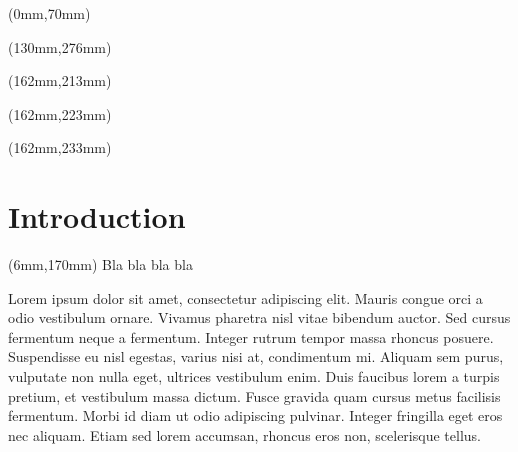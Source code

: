\documentclass[11pt,a4paper,english]{report}
\newcommand{\CorpDocTitle}{}
\newcommand{\CorpDocReviewDate}{}
\newcommand{\CorpDocAuthor}{}
\newcommand{\CorpChef}{}
\newcommand{\CorpDocType}{}
\newcommand{\CorpDocProject}{}
\def\wl{\par \vspace{\baselineskip}}
\begin{document}
\textblockorigin{0cm}{0cm} %
\begin{textblock*}{210mm}(0mm,70mm)
\centering
{ \bfseries\Huge
\CorpDocProject
\wl
\vspace{-1.2ex}
\CorpDocType
\wl
\vspace{-1.2ex}
 \CorpDocTitle
   }
\end{textblock*}

\begin{textblock*}{80mm}(130mm,276mm)  %
\huge\bfseries
\CorpDocTitle
\end{textblock*}

\begin{textblock*}{50mm}(162mm,213mm)  %
\huge\Large
\CorpDocReviewDate
\end{textblock*}

\begin{textblock*}{50mm}(162mm,223mm)  %
\huge\Large
\CorpDocAuthor
\end{textblock*}



\begin{textblock*}{50mm}(162mm,233mm)  %
\huge\Large
\CorpChef
\end{textblock*}





\pagestyle{fancy}

\tableofcontents
\pagestyle{fancy}
\chapter{Introduction}


\begin{textblock*}{50mm}(6mm,170mm)  %
 {
\small
Bla bla bla bla
}
\end{textblock*}

\par Lorem ipsum dolor sit amet, consectetur adipiscing elit. Mauris congue orci a odio vestibulum ornare. Vivamus pharetra nisl vitae bibendum auctor. Sed cursus fermentum neque a fermentum. Integer rutrum tempor massa rhoncus posuere. Suspendisse eu nisl egestas, varius nisi at, condimentum mi. Aliquam sem purus, vulputate non nulla eget, ultrices vestibulum enim. Duis faucibus lorem a turpis pretium, et vestibulum massa dictum. Fusce gravida quam cursus metus facilisis fermentum. Morbi id diam ut odio adipiscing pulvinar. Integer fringilla eget eros nec aliquam. Etiam sed lorem accumsan, rhoncus eros non, scelerisque tellus.
\end{document}
